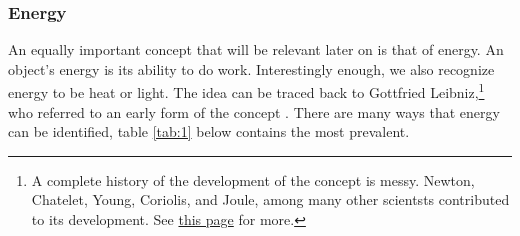 \documentclass{article}
\begin{document}
            \subsubsection{Energy}
                An equally important concept that will be relevant later on is that of energy. An object's energy is its ability to do work.
                Interestingly enough, we also recognize energy to be heat or light. The idea can be traced back to Gottfried Leibniz,\footnote{A complete history of the development of the concept is messy. Newton, Chatelet, Young, Coriolis, and Joule, among many other scientsts contributed to its development. See \href{https://spark.iop.org/history-concept-energy-and-work}{this page} for more.} 
                who referred to an early form of the concept \cite{Smith}.
                There are many ways that energy can be identified, table \ref{tab:1} below contains the most prevalent.
\end{document}
